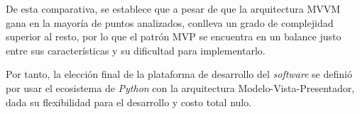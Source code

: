 De esta comparativa, se establece que a pesar de que la arquitectura MVVM gana en la mayoría de puntos analizados, conlleva un grado de complejidad superior al resto, por lo que el patrón MVP se encuentra en un balance justo entre sus características y su dificultad para implementarlo.

Por tanto, la elección final de la plataforma de desarrollo del \emph{software} se definió por usar el ecosistema de \emph{Python} con la arquitectura Modelo-Vista-Presentador, dada su flexibilidad para el desarrollo y costo total nulo.